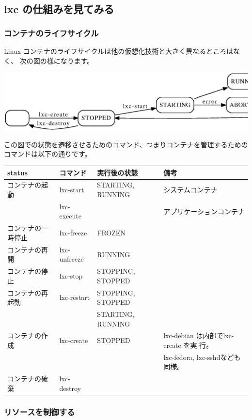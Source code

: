 \documentclass[mingoth,a4paper]{jsarticle}
\begin{document}
\subsection{lxc の仕組みを見てみる}
\subsubsection{コンテナのライフサイクル}

Linux コンテナのライフサイクルは他の仮想化技術と大きく異なるところはなく、
次の図の様になります。

\includegraphics[width=0.8\hsize]{image200912/lxc/lxc-lifecycle.eps}

この図での状態を遷移させるためのコマンド、つまりコンテナを管理するための
コマンドは以下の通りです。

{\footnotesize
\begin{tabular}[t]{|p{8em}|p{6em}|p{16em}|p{18em}|}
\hline
status &コマンド &実行後の状態 &備考 \\
\hline
\hline
コンテナの起動 &lxc-start &STARTING, RUNNING &システムコンテナ \\
&lxc-execute & &アプリケーションコンテナ\\
\hline
コンテナの一時停止 &lxc-freeze &FROZEN & \\
\hline
コンテナの再開 &lxc-unfreeze &RUNNING & \\
\hline
コンテナの停止 &lxc-stop &STOPPING, STOPPED & \\
\hline
コンテナの再起動 &lxc-restart &STOPPING, STOPPED & \\
& &STARTING, RUNNING & \\
\hline
コンテナの作成 &lxc-create &STOPPED &lxc-debian は内部でlxc-create を実
	     行。 \\
& & &lxc-fedora, lxc-sshdなども同様。 \\
\hline
コンテナの破棄 &lxc-destroy & & \\
\hline
\end{tabular}}

\subsubsection{リソースを制御する}
\end{document}
